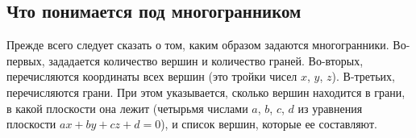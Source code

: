 \documentclass[a4paper,12pt, titlepage]{article}
\begin{document}
\subsection{Что понимается под многогранником}
\begin{flushleft}
 Прежде всего следует сказать о том, каким образом задаются многогранники. Во-первых, зададается 
количество вершин и количество граней. Во-вторых, перечисляются координаты всех вершин (это тройки
чисел $x$, $y$, $z$). В-третьих, перечисляются грани. При этом указывается, сколько вершин находится в
грани, в какой плоскости она лежит (четырьмя числами $a$, $b$, $c$, $d$ из уравнения плоскости 
$a x + b y + c z + d = 0$), и список вершин, которые ее составляют.
\end{flushleft}
\end{document}
